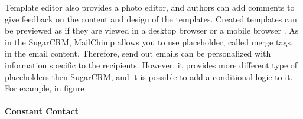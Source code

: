 Template editor also provides a photo editor, and authors can add comments to give feedback on the content and design of the templates. Created templates can be previewed as if they are viewed in a desktop browser or a mobile browser \citep{TheRocketScienceGroupLLC2013a}. As in the SugarCRM, MailChimp allows you to use placeholder, called merge tags, in the email content. Therefore, send out emails can be personalized with information specific to the recipients. However, it provides more different type of placeholders then SugarCRM, and it is possible to add a conditional logic to it. For example, in figure

\lstset{language=XML, tabsize=4}
\begin{center}
\end{center}

\paragraph{Constant Contact}

